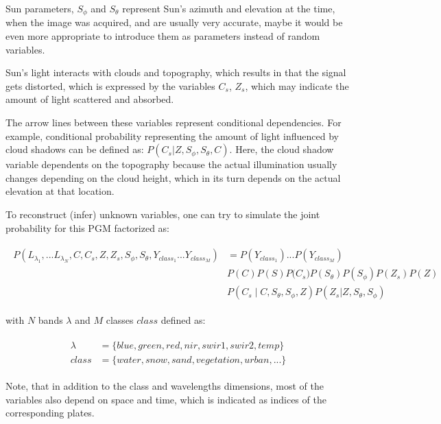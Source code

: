 Sun parameters, $S_\phi$ and $S_\theta$ represent Sun's azimuth and elevation at the time, when the image was acquired, and are usually very accurate, maybe it would be even more appropriate to introduce them as parameters instead of random variables.

Sun's light interacts with clouds and topography, which results in that the signal gets distorted, which is expressed by the variables $C_s$, $Z_s$, which may indicate the amount of light scattered and absorbed.

The arrow lines between these variables represent conditional dependencies. For example, conditional probability representing the amount of light influenced by cloud shadows can be defined as: $P(C_s|Z,S_\phi,S_\theta,C)$. Here, the cloud shadow variable dependents on the topography because the actual illumination usually changes depending on the cloud height, which in its turn depends on the actual elevation at that location.

To reconstruct (infer) unknown variables, one can try to simulate the joint probability for this PGM factorized as:

\begin{equation}
\begin{split}
\begin{aligned}
P{(L_{\lambda_1}, ... L_{\lambda_N}, C, C_s, Z, Z_s, S_\phi, S_\theta, Y_{class_1} ... Y_{class_M})} &= P(Y_{class_1}) ... P(Y_{class_M}) \\
& P{(C)} P{(S)} P({C_s)} P{(S_\theta)} P{(S_\phi)}  P{(Z_s)} P{(Z)} \\ 
& P{(C_s \mid C,S_\theta,S_\phi,Z)}  P{(Z_s|Z,S_\theta, S_\phi)}
\end{aligned}
\end{split}
\label{eq:bn-joint}
\end{equation}

with $N$ bands $\lambda$ and $M$ classes $class$ defined as:

\begin{equation}
\begin{split}
\begin{aligned}
\lambda &= \{blue, green, red, nir, swir1, swir2, temp\} \\
class &= \{water, snow, sand, vegetation, urban, ...\}
\end{aligned}
\end{split}
\end{equation}

Note, that in addition to the class and wavelengths dimensions, most of the variables also depend on space and time, which is indicated as indices of the corresponding plates. 

